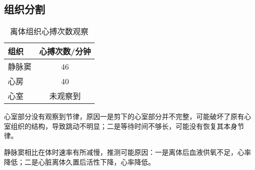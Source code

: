 \documentclass[UTF8]{article}
\begin{document}
    \subsection{组织分割}
    \begin{table}[H]
      \begin{center}
        \caption{离体组织心搏次数观察}
        \begin{tabular}{|l|c|}
          \hline
          \textbf{组织} & \textbf{心搏次数/分钟}\\
          \hline
          静脉窦 & 46\\
          心房 & 40\\
          心室 & 未观察到\\
          \hline
        \end{tabular}
      \end{center}
    \end{table}
    心室部分没有观察到节律，原因一是剪下的心室部分并不完整，可能破坏了原有心室组织的结构，导致跳动不明显；二是等待时间不够长，可能没有恢复其本身节律。

    静脉窦相比在体时速率有所减慢，推测可能原因：一是离体后血液供氧不足，心率降低；二是心脏离体久置后活性下降，心率降低。
\end{document}
